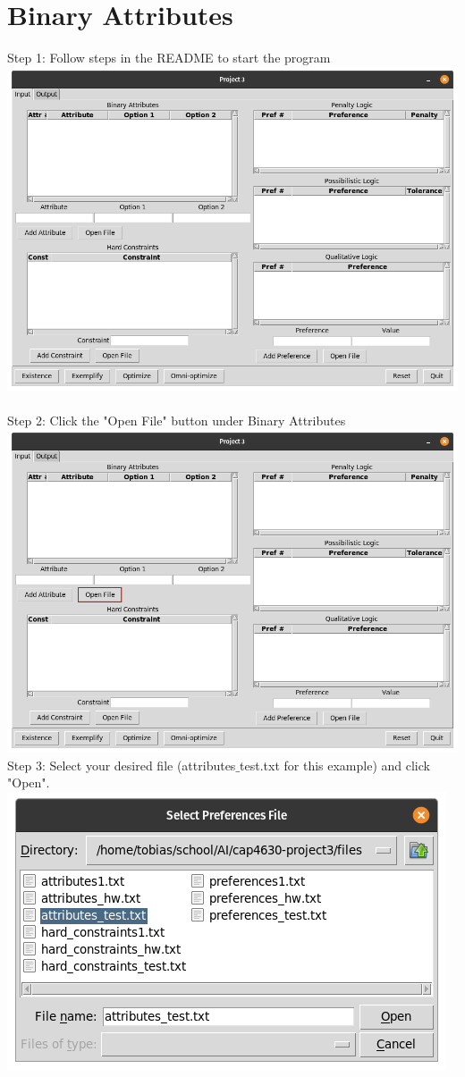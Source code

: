 \documentclass[12pt]{report}
\begin{document}
\section{Binary Attributes}
Step 1: Follow steps in the README to start the program\\
\includegraphics[scale=0.3]{input_start} \\\\
Step 2: Click the "Open File" button under Binary Attributes\\
\includegraphics[scale=0.3]{input_attributes}\newpage
Step 3: Select your desired file (attributes$\_$test.txt for this example) and click "Open".\\
\includegraphics[scale=0.3]{select_attributes}\\
\end{document}
